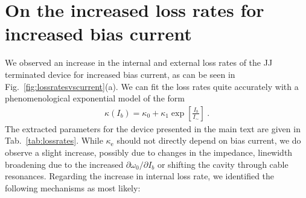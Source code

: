 \section{On the increased loss rates for increased bias current}\label{sec:lossrates}

% 
We observed an increase in the internal and external loss rates of the JJ terminated device for increased bias current, as can be seen in Fig.~\ref{fig:lossratesvscurrent}(a).
% 
We can fit the loss rates quite accurately with a phenomenological exponential model of the form
% 
\begin{align}
\kappa(I_b) = \kappa_0 + \kappa_1 \exp\left[\frac{I_b}{I_{\sim}}\right]\ .
\label{eq:lossrates}
\end{align}
% 
The extracted parameters for the device presented in the main text are given in Tab.~\ref{tab:lossrates}.
% 
While $\kappa_\text{e}$ should not directly depend on bias current, we do observe a slight increase, possibly due to changes in the impedance, linewidth broadening due to the increased $\partial\omega_0/\partial I_b$ or shifting the cavity through cable resonances.
% 
Regarding the increase in internal loss rate, we identified the following mechanisms as most likely:
% 
